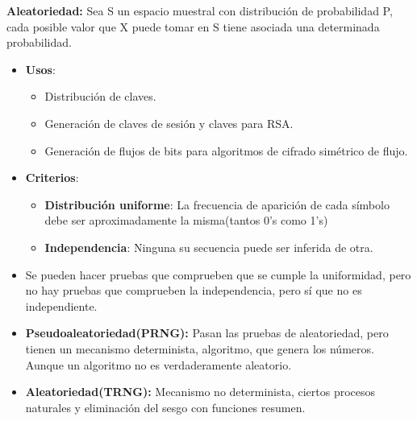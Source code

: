 \documentclass[12pt, twoside, openright]{report} %
\begin{document}
\textbf{Aleatoriedad:} Sea S un espacio muestral con distribución de probabilidad P, cada posible valor que X puede tomar en S tiene asociada una determinada probabilidad.
\begin{itemize}
	\item \textbf{Usos}:
	      \begin{itemize}
		      \item Distribución de claves.
		      \item Generación de claves de sesión y claves para RSA.
		      \item Generación de flujos de bits para algoritmos de cifrado simétrico de flujo.
	      \end{itemize}
	\item \textbf{Criterios}:
	      \begin{itemize}
		      \item \textbf{Distribución uniforme}: La frecuencia de aparición de cada símbolo debe ser aproximadamente la misma(tantos 0's como 1's)
		      \item \textbf{Independencia}: Ninguna su secuencia puede ser inferida de otra.
	      \end{itemize}
	\item Se pueden hacer pruebas que comprueben que se cumple la uniformidad, pero no hay pruebas que comprueben la independencia, pero sí que no es independiente.
	\item \textbf{Pseudoaleatoriedad(PRNG):} Pasan las pruebas de aleatoriedad, pero tienen un mecanismo determinista, algoritmo, que genera los números. Aunque un algoritmo no es verdaderamente aleatorio.
	\item \textbf{Aleatoriedad(TRNG):} Mecanismo no determinista, ciertos procesos naturales y eliminación del sesgo con funciones resumen.
\end{itemize}
\end{document}
